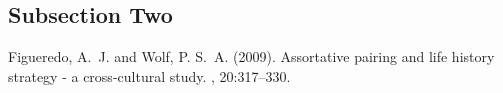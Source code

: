 \documentclass[twoside,twocolumn]{article}
\begin{document}
\subsection{Subsection Two}

\blindtext %


\begin{thebibliography}{99} %

Figueredo, A.~J. and Wolf, P. S.~A. (2009).
\newblock Assortative pairing and life history strategy - a cross-cultural
  study.
, 20:317--330.

\end{thebibliography}

\end{document}
